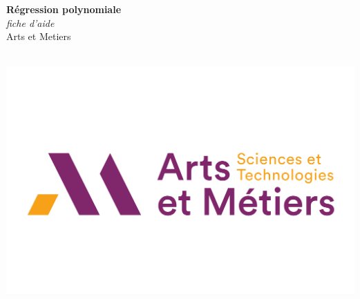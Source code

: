 \documentclass[a0,portrait]{a0poster}
\begin{document}


\begin{minipage}[b]{0.75\linewidth}
\veryHuge \color{NavyBlue} \textbf{Régression polynomiale} \color{Black}\\ %
\Huge\textit{fiche d'aide}\\[2cm] %
\huge Arts et Metiers\\[0.4cm] %
\\
\end{minipage}
%
\begin{minipage}[b]{0.25\linewidth}
\includegraphics[width=20cm]{logo.png}\\
\end{minipage}

\vspace{1cm} %


\end{document}
